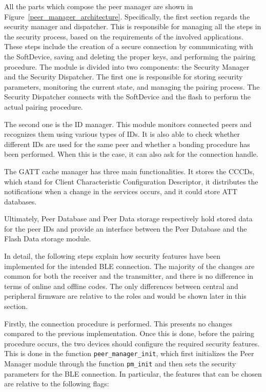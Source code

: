 \documentclass{Configuration_Files/PoliMi3i_thesis}
\begin{document}
All the parts which compose the peer manager are shown in Figure~\ref{peer_manager_architecture}. Specifically, the first section regards the security manager and dispatcher. This is responsible for managing all the steps in the security process, based on the requirements of the involved applications. These steps include the creation of a secure connection by communicating with the SoftDevice, saving and deleting the proper keys, and performing the pairing procedure. The module is divided into two components: the Security Manager and the Security Dispatcher. The first one is responsible for storing security parameters, monitoring the current state, and managing the pairing process. The Security Dispatcher connects with the SoftDevice and the flash to perform the actual pairing procedure.

The second one is the ID manager. This module monitors connected peers and recognizes them using various types of IDs. It is also able to check whether different IDs are used for the same peer and whether a bonding procedure has been performed. When this is the case, it can also ask for the connection handle.

The GATT cache manager has three main functionalities. It stores the CCCDs, which stand for Client Characteristic Configuration Descriptor, it distributes the notifications when a change in the services occurs, and it could store ATT databases.

Ultimately, Peer Database and Peer Data storage respectively hold stored data for the peer IDs and provide an interface between the Peer Database and the Flash Data storage module.

In detail, the following steps explain how security features have been implemented for the intended BLE connection. The majority of the changes are common for both the receiver and the transmitter, and there is no difference in terms of online and offline codes. The only differences between central and peripheral firmware are relative to the roles and would be shown later in this section.

Firstly, the connection procedure is performed. This presents no changes compared to the previous implementation. Once this is done, before the pairing procedure occurs, the two devices should configure the required security features. This is done in the function \texttt{peer\_manager\_init}, which first initializes the Peer Manager module through the function \texttt{pm\_init} and then sets the security parameters for the BLE connection. In particular, the features that can be chosen are relative to the following flags:
\end{document}
